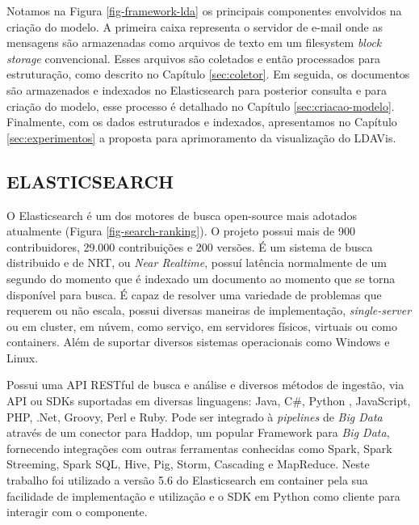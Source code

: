 \documentclass[12pt,a4paper]{article}
\begin{document}
Notamos na Figura \ref{fig-framework-lda} os principais componentes envolvidos na criação do modelo. A primeira caixa representa o servidor de 
 e-mail onde as mensagens são armazenadas como arquivos de texto em um filesystem \textit{block storage} convencional. Esses arquivos são coletados e então
 processados para estruturação, como descrito no Capítulo \ref{sec:coletor}. Em seguida, os documentos são armazenados e indexados no Elasticsearch para
 posterior consulta e para criação do modelo, esse processo é detalhado no Capítulo \ref{sec:criacao-modelo}. Finalmente, com os dados estruturados
 e indexados, apresentamos no Capítulo \ref{sec:experimentos} a proposta para aprimoramento da visualização do LDAVis.

\subsection{ELASTICSEARCH} \label{sec:elasticsearch}

O Elasticsearch é um dos motores de busca open-source mais adotados atualmente (Figura \ref{fig-search-ranking}). 
 O projeto possui mais de 900 contribuidores, 29.000
 contribuições e 200 versões. É um sistema de busca distribuido  e de NRT, ou \textit{Near Realtime}, possuí latência normalmente de um segundo
 do momento que é indexado um documento ao momento que se torna disponível para busca. É capaz de resolver uma variedade de problemas que requerem ou não escala,
 possui diversas maneiras de implementação, \textit{single-server} ou em cluster, em núvem, como serviço, em servidores físicos, virtuais ou como containers.
 Além de suportar diversos sistemas operacionais como Windows e Linux.

Possui uma API RESTful de busca e análise e diversos métodos de ingestão, via API ou SDKs suportadas em diversas linguagens:
 Java, C\#, Python , JavaScript, PHP, .Net, Groovy, Perl e Ruby. Pode ser integrado à \textit{pipelines} de \textit{Big Data} através
 de um conector para Haddop, um popular Framework para \textit{Big Data}, fornecendo integrações com outras ferramentas conhecidas como Spark, Spark Streeming, Spark SQL,
 Hive, Pig, Storm, Cascading e MapReduce. Neste trabalho foi utilizado a versão 5.6 do Elasticsearch em container pela sua facilidade de implementação e utilização e o SDK em Python como cliente para interagir com o componente. 
\end{document}
